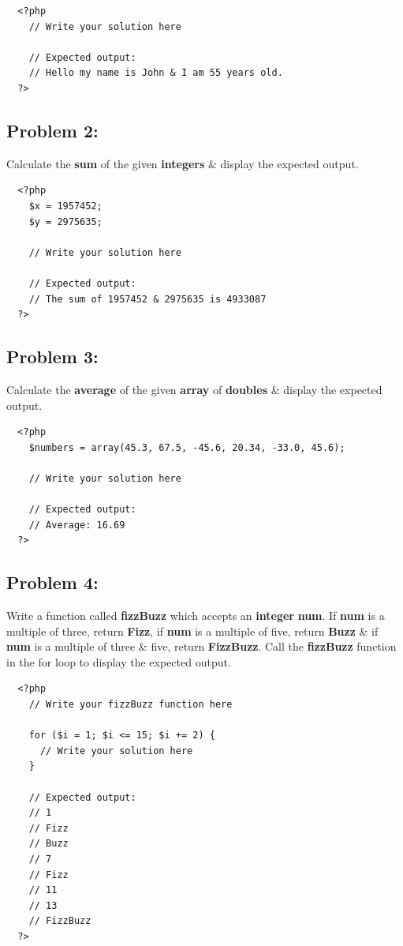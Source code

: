 \documentclass{article}
\begin{document}
\begin{verbatim}
  <?php
    // Write your solution here

    // Expected output:
    // Hello my name is John & I am 55 years old.
  ?>
\end{verbatim}

\subsection*{Problem 2:} Calculate the \textbf{sum} of the given \textbf{integers} \& display the expected output.

\begin{verbatim}
  <?php
    $x = 1957452;
    $y = 2975635;

    // Write your solution here

    // Expected output:
    // The sum of 1957452 & 2975635 is 4933087
  ?>
\end{verbatim}

\subsection*{Problem 3:} 
Calculate the \textbf{average} of the given \textbf{array} of \textbf{doubles} \& display the expected output.

\begin{verbatim}
  <?php
    $numbers = array(45.3, 67.5, -45.6, 20.34, -33.0, 45.6);

    // Write your solution here

    // Expected output:
    // Average: 16.69 
  ?>
\end{verbatim}

\subsection*{Problem 4:}
Write a function called \textbf{fizzBuzz} which accepts an \textbf{integer} \textbf{num}. If \textbf{num} is a multiple of three, return \textbf{Fizz}, if \textbf{num} is a multiple of five, return \textbf{Buzz} \& if \textbf{num} is a multiple of three \& five, return \textbf{FizzBuzz}. Call the \textbf{fizzBuzz} function in the for loop to display the expected output.

\begin{verbatim}
  <?php
    // Write your fizzBuzz function here
    
    for ($i = 1; $i <= 15; $i += 2) {
      // Write your solution here
    }

    // Expected output:
    // 1
    // Fizz 
    // Buzz
    // 7
    // Fizz
    // 11
    // 13
    // FizzBuzz
  ?>
\end{verbatim}
\end{document}
